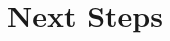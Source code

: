\documentclass[aspectratio=169,10pt]{beamer}
\begin{document}



\section{Next Steps}
\end{document}
